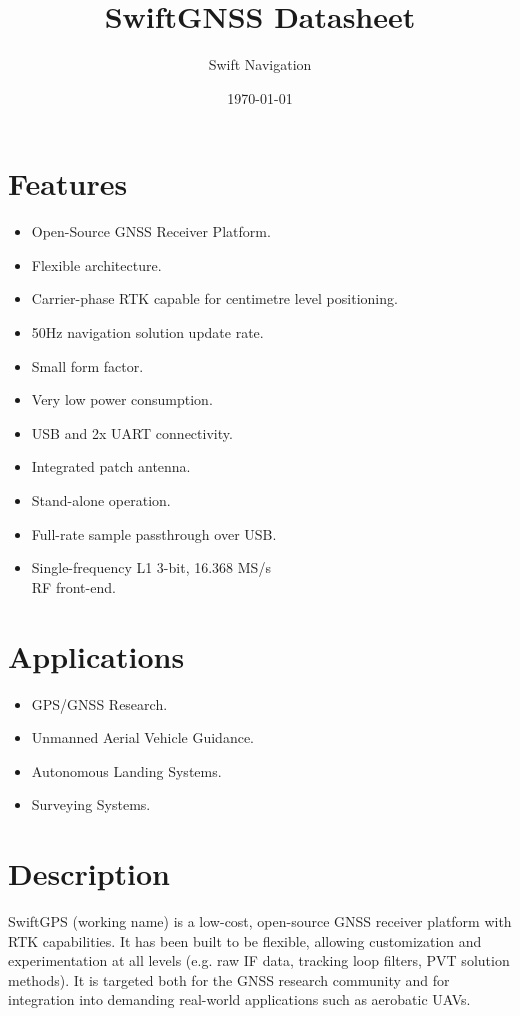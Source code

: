 \documentclass{article}
\title{SwiftGNSS Datasheet}
\author{Swift Navigation}
\date{\today}
\begin{document}
\maketitle

\begin{multicols*}{2}
\raggedcolumns

\section*{Features}
\large
\label{sec:Features}
\begin{itemize}
  \bulletnoindent
  \item Open-Source GNSS Receiver Platform.
  \item Flexible architecture.
  \item Carrier-phase RTK capable for centimetre level positioning.
  \item 50Hz navigation solution update rate.
  \item Small form factor.
  \item Very low power consumption.
  \item USB and 2x UART connectivity.
  \item Integrated patch antenna.
  \item Stand-alone operation.
  \item Full-rate sample passthrough over USB.
  \item Single-frequency L1 3-bit, 16.368 MS/s\\RF front-end.
\end{itemize}
\normalsize

\section*{Applications}
\large
\label{sec:Applications}
\begin{itemize}
  \bulletnoindent
  \item GPS/GNSS Research.
  \item Unmanned Aerial Vehicle Guidance.
  \item Autonomous Landing Systems.
  \item Surveying Systems.
\end{itemize}
\normalsize

\section*{Description}

SwiftGPS (working name) is a low-cost, open-source GNSS receiver
platform with RTK capabilities.  It has been built to be flexible,
allowing customization and experimentation at all levels (e.g. raw IF
data, tracking loop filters, PVT solution methods).  It is targeted both for
the GNSS research community and for integration into demanding real-world
applications such as aerobatic UAVs.


\end{multicols*}
\end{document}
